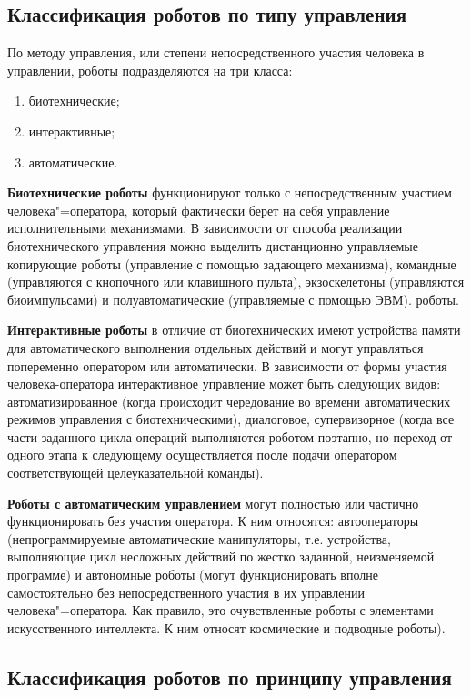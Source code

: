 \documentclass[bachelor, och, referat]{SCWorks}
\begin{document}
\subsection{Классификация роботов по типу управления}
По методу управления, или степени непосредственного участия человека в
управлении, роботы подразделяются на три класса:

\begin{enumerate}
    \item биотехнические;
    \item интерактивные;
    \item автоматические.
\end{enumerate}

\textbf{Биотехнические роботы} функционируют только с непосредственным участием
человека"=оператора, который фактически берет на себя управление исполнительными
механизмами. В зависимости от способа реализации биотехнического управления
можно выделить дистанционно управляемые копирующие роботы (управление с помощью
задающего механизма), командные (управляются с кнопочного или клавишного
пульта), экзоскелетоны (управляются биоимпульсами) и полуавтоматические
(управляемые с помощью ЭВМ). роботы.

\textbf{Интерактивные роботы} в отличие от биотехнических имеют устройства
памяти для автоматического выполнения отдельных действий и могут управляться
попеременно оператором или автоматически. В зависимости от формы участия человека-оператора интерактивное
управление может быть следующих видов: автоматизированное (когда происходит чередование во времени
автоматических режимов управления с биотехническими), диалоговое, супервизорное (когда все части заданного цикла операций выполняются роботом поэтапно, но переход от одного этапа к следующему
осуществляется после подачи оператором соответствующей целеуказательной команды).

\textbf{Роботы с автоматическим управлением} могут полностью или частично
функционировать без участия оператора. К ним относятся: автооператоры
(непрограммируемые автоматические манипуляторы, т.е. устройства, выполняющие
цикл несложных действий по жестко заданной, неизменяемой программе) и автономные
роботы (могут функционировать вполне самостоятельно без непосредственного
участия в их управлении человека"=оператора. Как правило, это очувствленные
роботы с элементами искусственного интеллекта. К ним относят космические и
подводные роботы).

\subsection{Классификация роботов по принципу управления}
\end{document}
